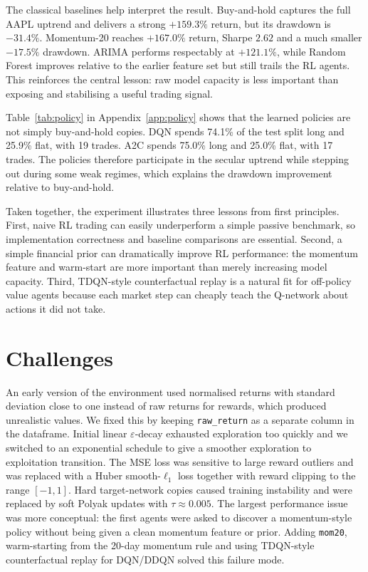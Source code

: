 \documentclass[11pt,twocolumn]{article}
\begin{document}
The classical baselines help interpret the result. Buy-and-hold captures the full AAPL uptrend and delivers a strong $+159.3\%$ return, but its drawdown is $-31.4\%$. Momentum-20 reaches $+167.0\%$ return, Sharpe $2.62$ and a much smaller $-17.5\%$ drawdown. ARIMA performs respectably at $+121.1\%$, while Random Forest improves relative to the earlier feature set but still trails the RL agents. This reinforces the central lesson: raw model capacity is less important than exposing and stabilising a useful trading signal.

Table~\ref{tab:policy} in Appendix~\ref{app:policy} shows that the learned policies are not simply buy-and-hold copies. DQN spends 74.1\% of the test split long and 25.9\% flat, with 19 trades. A2C spends 75.0\% long and 25.0\% flat, with 17 trades. The policies therefore participate in the secular uptrend while stepping out during some weak regimes, which explains the drawdown improvement relative to buy-and-hold.

Taken together, the experiment illustrates three lessons from first principles. First, naive RL trading can easily underperform a simple passive benchmark, so implementation correctness and baseline comparisons are essential. Second, a simple financial prior can dramatically improve RL performance: the momentum feature and warm-start are more important than merely increasing model capacity. Third, TDQN-style counterfactual replay is a natural fit for off-policy value agents because each market step can cheaply teach the Q-network about actions it did not take.

\section{Challenges}

An early version of the environment used normalised returns with standard deviation close to one instead of raw returns for rewards, which produced unrealistic values. We fixed this by keeping \texttt{raw\_return} as a separate column in the dataframe. Initial linear $\varepsilon$-decay exhausted exploration too quickly and we switched to an exponential schedule to give a smoother exploration to exploitation transition. The MSE loss was sensitive to large reward outliers and was replaced with a Huber smooth-$\ell_1$ loss together with reward clipping to the range $[-1,1]$. Hard target-network copies caused training instability and were replaced by soft Polyak updates with $\tau \approx 0.005$. The largest performance issue was more conceptual: the first agents were asked to discover a momentum-style policy without being given a clean momentum feature or prior. Adding \texttt{mom20}, warm-starting from the 20-day momentum rule and using TDQN-style counterfactual replay for DQN/DDQN solved this failure mode.
\end{document}
